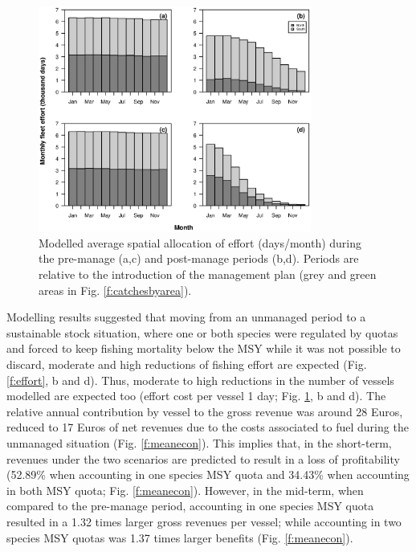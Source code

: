 \documentclass[12pt,oneline,a4paper,numbib]{ouparticle}
\numberwithin{equation}{subsection} %
\begin{document}
\begin{figure}[!ht]
\centering
\includegraphics[width=0.8\textwidth]{Figures/Meaneffort.eps} 
\caption{Modelled average spatial allocation of effort (days/month) during the pre-manage (a,c) and post-manage periods (b,d). Periods are relative to the introduction of the management plan (grey and green areas in Fig. \ref{f:catchesbyarea}).}
\label{f:meaneffort}
\end{figure}

Modelling results suggested that moving from an unmanaged period to a sustainable stock situation, where one or both species were regulated by quotas and forced to keep fishing mortality below the MSY while it was not possible to discard, moderate and high reductions of fishing effort are expected (Fig. \ref{f:effort}, b and d). Thus, moderate to high reductions in the number of vessels modelled are expected too (effort cost per vessel 1 day; Fig. \ref{f:meaneffort}, b and d). The relative annual contribution by vessel to the gross revenue was around 28 Euros, reduced to 17 Euros of net revenues due to the costs associated to fuel during the unmanaged situation (Fig. \ref{f:meanecon}). This implies that, in the short-term, revenues under the two scenarios are predicted to result in a loss of profitability (52.89\% when accounting in one species MSY quota and 34.43\% when accounting in both MSY quota; Fig. \ref{f:meanecon}). However, in the mid-term, when compared to the pre-manage period, accounting in one species MSY quota resulted in a 1.32 times larger gross revenues per vessel; while accounting in two species MSY quotas was 1.37 times larger benefits (Fig. \ref{f:meanecon}). 
\end{document}
